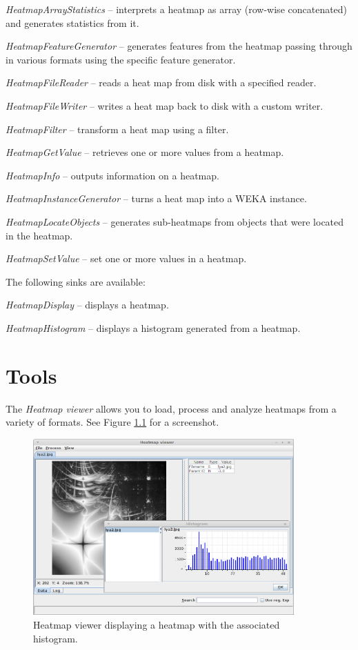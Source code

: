 \documentclass[a4paper]{book}
\begin{document}
\begin{tight_itemize}
  	\item \textit{HeatmapArrayStatistics} -- interprets a heatmap as array
  	(row-wise concatenated) and generates statistics from it.
  	\item \textit{HeatmapFeatureGenerator} -- generates features from the
  	heatmap passing through in various formats using the specific feature
  	generator.
  	\item \textit{HeatmapFileReader} -- reads a heat map from disk with a
  	specified reader.
  	\item \textit{HeatmapFileWriter} -- writes a heat map back to disk with
  	a custom writer.
  	\item \textit{HeatmapFilter} -- transform a heat map using a filter.
  	\item \textit{HeatmapGetValue} -- retrieves one or more values from a heatmap.
  	\item \textit{HeatmapInfo} -- outputs information on a heatmap.
  	\item \textit{HeatmapInstanceGenerator} -- turns a heat map into a WEKA
  	instance.
  	\item \textit{HeatmapLocateObjects} -- generates sub-heatmaps from objects
  	that were located in the heatmap.
  	\item \textit{HeatmapSetValue} -- set one or more values in a heatmap.
\end{tight_itemize}
The following sinks are available:
\begin{tight_itemize}
  	\item \textit{HeatmapDisplay} -- displays a heatmap.
  	\item \textit{HeatmapHistogram} -- displays a histogram generated from a heatmap.
\end{tight_itemize}

\chapter{Tools}

The \textit{Heatmap viewer} allows you to load, process and analyze heatmaps
from a variety of formats. See Figure \ref{heatmap-viewer} for a screenshot.
\begin{figure}[htb]
  \centering
  \includegraphics[width=10.0cm]{images/heatmap-viewer.png}
  \caption{Heatmap viewer displaying a heatmap with the associated histogram.}
  \label{heatmap-viewer}
\end{figure}
\end{document}
